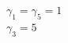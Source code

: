\documentclass[preview]{standalone}
\begin{document}
\begin{center}
$\gamma_1 = \gamma_5 = 1$\\$\gamma_3 = 5$
\end{center}
\end{document}
